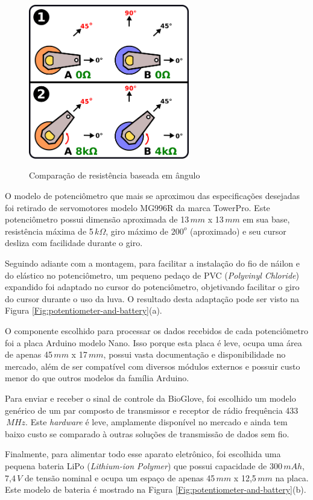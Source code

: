 \documentclass[
	12pt,				%
	openright,			%
	oneside,			%
	a4paper,			%
	english,			%
	brazil				%
	]{abntex2}
\begin{document}
		\begin{figure}[h!]
			\centering
			\caption{Comparação de resistência baseada em ângulo}
  		\includegraphics[width=7cm]{./figures/pot-comparison.png}
  		\label{Fig:pot-comparison}
		\end{figure}
			
			O modelo de potenciômetro que mais se aproximou das especificações desejadas foi retirado de servomotores modelo MG996R da marca TowerPro. Este potenciômetro possui dimensão aproximada de 13$\,mm$ x 13$\,mm$ em sua base, resistência máxima de 5$\,k\Omega$, giro máximo de $200^{o}$ (aproximado) e seu cursor desliza com facilidade durante o giro. 

			Seguindo adiante com a montagem, para facilitar a instalação do fio de náilon e do elástico no potenciômetro, um pequeno pedaço de PVC (\textit{Polyvinyl Chloride}) expandido foi adaptado no cursor do potenciômetro, objetivando facilitar o giro do cursor durante o uso da luva. O resultado desta adaptação pode ser visto na Figura \ref{Fig:potentiometer-and-battery}(a).

			O componente escolhido para processar os dados recebidos de cada potenciômetro foi a placa Arduino modelo Nano. Isso porque esta placa é leve, ocupa uma área de apenas 45$\,mm$ x 17$\,mm$, possui vasta documentação e disponibilidade no mercado, além de ser compatível com diversos módulos externos e possuir custo menor do que outros modelos da família Arduino.

			Para enviar e receber o sinal de controle da BioGlove, foi escolhido um modelo genérico de um par composto de transmissor e receptor de rádio frequência 433$\,MHz$. Este \textit{hardware} é leve, amplamente disponível no mercado e ainda tem baixo custo se comparado à outras soluções de transmissão de dados sem fio.

			Finalmente, para alimentar todo esse aparato eletrônico, foi escolhida uma pequena bateria LiPo (\textit{Lithium-ion Polymer}) que possui capacidade de 300$\,mAh$, 7,4$\,V$ de tensão nominal e ocupa um espaço de apenas 45$\,mm$ x 12,5$\,mm$ na placa. Este modelo de bateria é mostrado na Figura \ref{Fig:potentiometer-and-battery}(b).
\end{document}
